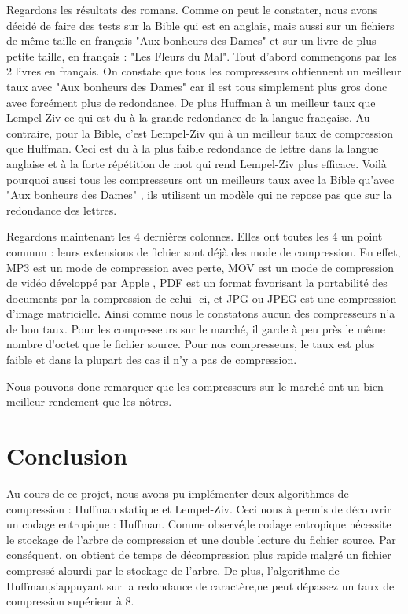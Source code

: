 \documentclass{report}
\begin{document}
Regardons les résultats des romans. Comme on peut le constater, nous avons décidé de faire des tests sur la Bible qui est en anglais, mais aussi sur un fichiers de même taille en français "Aux bonheurs des Dames" et sur un livre de plus petite taille, en français  : "Les Fleurs du Mal". Tout d'abord commençons par les 2 livres en français. On constate que tous les compresseurs obtiennent un meilleur taux avec "Aux bonheurs des Dames" car il est tous simplement plus gros donc avec forcément plus de redondance. De plus Huffman à un meilleur taux que Lempel-Ziv ce qui est du à la grande redondance de la langue française. 
 Au contraire, pour la Bible, c'est Lempel-Ziv qui à un meilleur taux de compression que Huffman. Ceci est du à la plus faible redondance de lettre dans la langue anglaise et à la forte répétition de mot qui rend Lempel-Ziv plus efficace.
Voilà pourquoi aussi tous les compresseurs ont un meilleurs taux avec la Bible qu'avec "Aux bonheurs des Dames" , ils utilisent un modèle qui ne repose pas que sur la redondance des lettres. 

Regardons maintenant les 4 dernières colonnes. Elles ont toutes les 4 un point commun : leurs extensions de fichier sont déjà des mode de compression. En effet, MP3 est un mode de compression avec perte, MOV est un mode de compression de vidéo développé par Apple , PDF est un format favorisant la portabilité des documents par la compression de celui -ci, et JPG ou JPEG est une compression d'image matricielle. Ainsi comme nous le constatons aucun des compresseurs n'a de bon taux. Pour les compresseurs sur le marché, il garde à peu près le même nombre d'octet que le fichier source. Pour nos compresseurs, le taux est plus faible et dans la plupart des cas il n'y a pas de compression. 

Nous pouvons donc remarquer que les compresseurs sur le marché ont un bien meilleur rendement que les nôtres.



\section*{Conclusion}
Au cours de ce projet, nous avons pu implémenter deux algorithmes de compression :  Huffman statique et Lempel-Ziv. Ceci nous à permis de découvrir un codage entropique : Huffman. Comme observé,le codage entropique nécessite le stockage de l'arbre de compression et une double lecture du fichier source. Par conséquent, on obtient de temps de décompression plus rapide malgré un fichier compressé alourdi par le stockage de l'arbre. De plus, l'algorithme de Huffman,s'appuyant sur la redondance de caractère,ne peut dépassez un taux de compression supérieur à 8.
\end{document}

